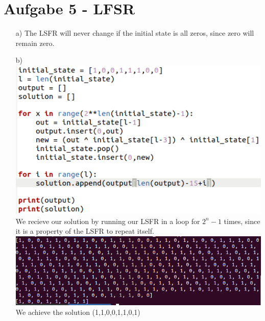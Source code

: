\documentclass{article}
\theoremstyle{definition}
\theoremstyle{remark}
\begin{document}
\section*{Aufgabe 5 - LFSR}
\begin{itemize}
    \item[a)] The LSFR will never change if the initial state is all zeros, since zero will remain zero.
    \item[b)]\phantom{hi} \\
    \includegraphics[scale = 0.5]{Task_5_b.png}\\
    We recieve our solution by running our LSFR in a loop for $2^n -1$ times, since it is a property of the LSFR to repeat itself.\\
    \includegraphics[scale=0.5]{Task5b_solution.png}\\
    We achieve the solution (1,1,0,0,1,1,0,1)
\end{itemize}
\end{document}
